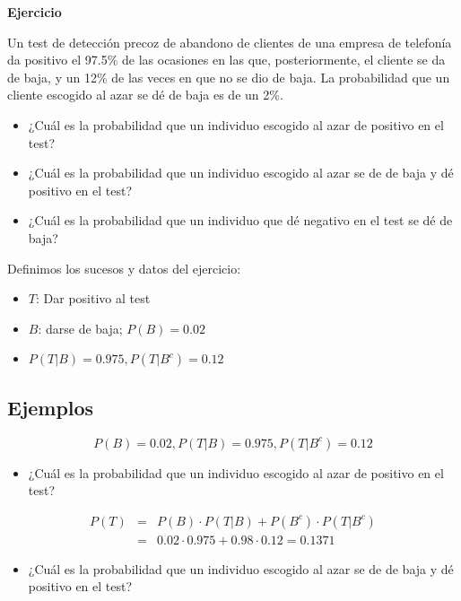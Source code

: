 \documentclass[]{book}
\providecommand{\tightlist}{%
  \setlength{\itemsep}{0pt}\setlength{\parskip}{0pt}}
\begin{document}
\textbf{Ejercicio}

Un test de detección precoz de abandono de clientes de una empresa de telefonía da positivo el 97.5\% de las ocasiones en las que, posteriormente, el cliente se da de baja, y un 12\% de las veces en que no se dio de baja. La probabilidad que un cliente escogido al azar se dé de baja es de un 2\%.

\begin{itemize}
\tightlist
\item
  ¿Cuál es la probabilidad que un individuo escogido al azar de positivo en el test?
\item
  ¿Cuál es la probabilidad que un individuo escogido al azar se de de baja y dé positivo en el test?
\item
  ¿Cuál es la probabilidad que un individuo que dé negativo en el test se dé de baja?
\end{itemize}

Definimos los sucesos y datos del ejercicio:

\begin{itemize}
\tightlist
\item
  \(T\): Dar positivo al test
\item
  \(B\): darse de baja; \(P(B)=0.02\)
\item
  \(P(T|B)=0.975, P(T|B^c)=0.12\)
\end{itemize}

\hypertarget{ejemplos-10}{%
\subsection{Ejemplos}\label{ejemplos-10}}

\[P(B)=0.02, P(T|B)=0.975, P(T|B^c)=0.12\]

\begin{itemize}
\tightlist
\item
  ¿Cuál es la probabilidad que un individuo escogido al azar de positivo en el test?
\end{itemize}

\begin{eqnarray*}
P(T) &= & P(B)\cdot P(T|B)+P(B^c)\cdot P(T|B^c)\\
& = &0.02\cdot 0.975+0.98\cdot 0.12=0.1371
\end{eqnarray*}

\begin{itemize}
\tightlist
\item
  ¿Cuál es la probabilidad que un individuo escogido al azar se de de baja y dé positivo en el test?
\end{itemize}
\end{document}
